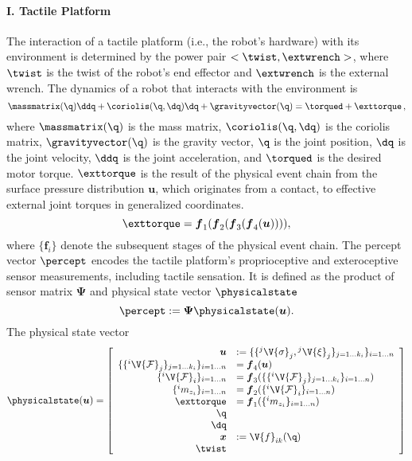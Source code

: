 \paragraph*{I. Tactile Platform}
The interaction of a tactile platform (i.e., the robot's hardware) with its environment is determined by the power pair ${<\twist,\extwrench>}$, where $\twist$ is the twist of the robot's end effector and $\extwrench$ is the external wrench. The dynamics of a robot that interacts with the environment is
\begin{equation*}
    \massmatrix(\q) \ddq + \coriolis(\q,\dq) \dq + \gravityvector(\q) = \torqued + \exttorque\,,
\end{equation*}
where $\massmatrix(\q)$ is the  mass matrix, $\coriolis(\q,\dq)$ is the coriolis matrix, $\gravityvector(\q)$ is the gravity vector, $\q$ is the joint position, $\dq$ is the joint velocity, $\ddq$ is the joint acceleration, and $\torqued$ is the desired motor torque.
$\exttorque$ is the result of the physical event chain from the surface pressure distribution $\boldsymbol{u}$, which originates from a contact, to effective external joint torques in generalized coordinates. 
\begin{equation*}\exttorque=\boldsymbol{f}_1(\boldsymbol{f}_2(\boldsymbol{f}_3(\boldsymbol{f}_4(\boldsymbol{u})))),
\end{equation*}
where $\{\boldsymbol{f}_i\}$ denote the subsequent stages of the physical event chain. The percept vector $\percept$ encodes the tactile platform's proprioceptive and exteroceptive sensor measurements, including tactile sensation. It is defined as the product of sensor matrix $\boldsymbol{\Psi}$ and physical state vector $\physicalstate$
\begin{equation*}
    \percept:= \boldsymbol{\Psi} \physicalstate(\boldsymbol{u}).
\end{equation*}
The physical state vector 
\begin{equation*}    
    \boldsymbol{\physicalstate}(\boldsymbol{u}) = \left[\begin{array}{rl}
        \boldsymbol{u} & := \{\{{}^j\V{\sigma}_j,{}^j\V{\xi}_j\}_{j=1\dots k_i}\}_{i=1\dots n} \\
        \{\{{}^i\V{\mathcal{F}}_j\}_{j=1\dots k_i}\}_{i=1\dots n} & = \boldsymbol{f}_4(\boldsymbol{u}) \\
        \{{}^i \V{\mathcal{F}}_i\}_{i=1\dots n} & = \boldsymbol{f}_3(\{\{{}^i \V{\mathcal{F}}_j\}_{j=1\dots k_i}\}_{i=1\dots n})\\
        \{{}^i m_{z_i}\}_{i=1\dots n} & = \boldsymbol{f}_2(\{{}^i \V{\mathcal{F}}_i\}_{i=1\dots n})\\
        \exttorque & = \boldsymbol{f}_1(\{{}^i m_{z_i}\}_{i=1\dots n})\\
        \q &  \\
        \dq & \\
        \boldsymbol{x}& :=\V{f}_{ik}(\q) \\
        \twist &  \\ 
    \end{array}\right]
\end{equation*}
